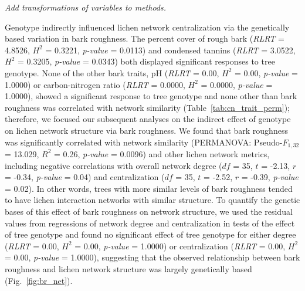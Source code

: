 \documentclass[fleqn,12pt]{olplainarticle}
\begin{document}
\textit{Add transformations of variables to methods.}

Genotype indirectly influenced lichen network centralization via the
genetically based variation in bark roughness. The percent cover of
rough bark (\textit{RLRT} = 4.8526, $H^2$ = 0.3221, \textit{p-value} =
0.0113) and condensed tannins (\textit{RLRT} = 3.0522, $H^2$ = 0.3205,
\textit{p-value} = 0.0343) both displayed significant responses to
tree genotype. None of the other bark traits, pH (\textit{RLRT} =
0.00, $H^2$ = 0.00, \textit{p-value} = 1.0000) or carbon-nitrogen
ratio (\textit{RLRT} = 0.0000, $H^2$ = 0.0000, \textit{p-value} =
1.0000), showed a significant response to tree genotype and none other
than bark roughness was correlated with network similarity
(Table~\ref{tab:cn_trait_perm}); therefore, we focused our subsequent
analyses on the indirect effect of genotype on lichen network
structure via bark roughness. We found that bark roughness was
significantly correlated with network similarity (PERMANOVA:
Pseudo-$F_{1,32}$ = 13.029, $R^2$ = 0.26, \textit{p-value} = 0.0096)
and other lichen network metrics, including negative correlations with
overall network degree ($df$ = 35, $t$ = -2.13, $r$ = -0.34,
\textit{p-value} = 0.04) and centralization ($df$ = 35, $t$ = -2.52,
$r$ = -0.39, \textit{p-value} = 0.02). In other words, trees with more
similar levels of bark roughness tended to have lichen interaction
networks with similar structure. To quantify the genetic bases of this
effect of bark roughness on network structure, we used the residual
values from regressions of network degree and centralization in tests
of the effect of tree genotype and found no significant effect of tree
genotype for either degree (\textit{RLRT} = 0.00, $H^2$ = 0.00,
\textit{p-value} = 1.0000) or centralization (\textit{RLRT} = 0.00,
$H^2$ = 0.00, \textit{p-value} = 1.0000), suggesting that the observed
relationship between bark roughness and lichen network structure was
largely genetically based (Fig.~\ref{fig:br_net}).


\end{document}
